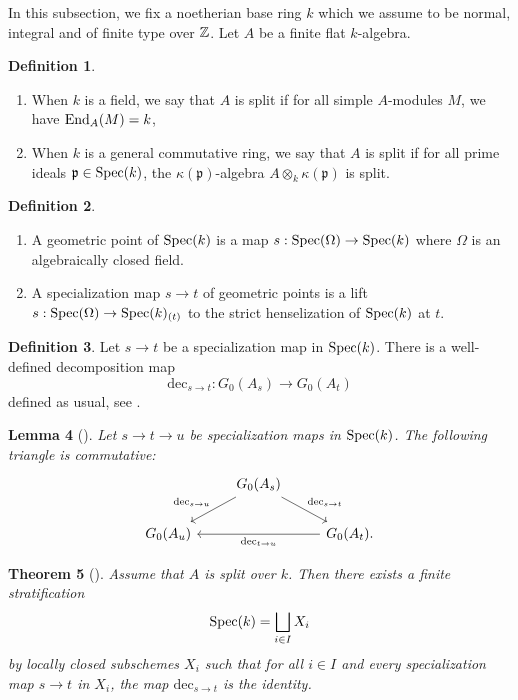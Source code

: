 \documentclass[a4paper, 10pt, oneside, reqno]{amsart}
\theoremstyle{plain}
\newtheorem{thm}{Theorem}[subsection]
\newtheorem{lem}[thm]{Lemma}
\theoremstyle{definition}
\newtheorem{defi}[thm]{Definition}
\theoremstyle{remark}
\newcommand{\dec}{\mathrm{dec}}
\begin{document}
In this subsection, we fix a noetherian base ring $k$ which we assume to be normal, integral and of finite type over $\mathbb{Z}$. Let $A$ be a finite flat $k$-algebra. 
\begin{defi}
\begin{enumerate}
\item When $k$ is a field, we say that $A$ is split if for all simple $A$-modules $M$, we have $\mathrm{End}_A(M) = k$,
\item When $k$ is a general commutative ring, we say that $A$ is split if for all prime ideals $\mathfrak{p} \in \mathrm{Spec}(k)$, the $\kappa(\mathfrak{p})$-algebra $A \otimes_k \kappa(\mathfrak{p})$ is split. 
\end{enumerate}
\end{defi}

\begin{defi}
\begin{enumerate}
\item A geometric point of $\mathrm{Spec}(k)$ is a map $s : \mathrm{Spec}(\Omega) \to \mathrm{Spec}(k)$ where $\Omega$ is an algebraically closed field.
\item A specialization map $s \to t$ of geometric points is a lift $s : \mathrm{Spec}(\Omega) \to \mathrm{Spec}(k)_{(t)}$ to the strict henselization of $\mathrm{Spec}(k)$ at $t$. 
\end{enumerate}
\end{defi}

\begin{defi}
Let $s \to t$ be a specialization map in $\mathrm{Spec}(k)$. There is a well-defined decomposition map
$$\dec_{s \to t} : G_0(A_s) \to G_0(A_t)$$
defined as usual, see \cite[Section 2]{GeckHeckeAlgRootOfUnity}. 
\end{defi}

\begin{lem}[]\label{lem:composition-decomp-matrices} 
Let $s \to t \to u$ be specialization maps in $\mathrm{Spec}(k)$. The following triangle is commutative: 
\[\begin{tikzcd}
	& {G_0(A_s)} & \\
	{G_0(A_u)} && {G_0(A_t).}
	\arrow["{\dec_{s \to u}}"', from=1-2, to=2-1]
	\arrow["{\dec_{s \to t}}", from=1-2, to=2-3]
	\arrow["{\dec_{t \to u}}", from=2-3, to=2-1]
\end{tikzcd}\]
\end{lem}

\begin{thm}[]\label{thm:stratification-splitting-dec-map}
Assume that $A$ is split over $k$. Then there exists a finite stratification 
$$\mathrm{Spec}(k) = \bigsqcup_{i \in I} X_i$$
by locally closed subschemes $X_i$ such that for all $i \in I$ and every specialization map $s \to t$ in $X_i$, the map $\dec_{s \to t}$ is the identity.
\end{thm}
\end{document}
